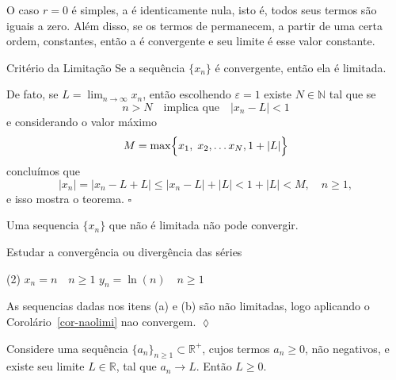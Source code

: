 O caso $r=0$ \'{e} simples, a \seq \'{e} identicamente nula, isto \'{e}, todos seus termos s\~{a}o iguais a zero. Al\'{e}m disso, se os termos de \seq permanecem, a partir de uma certa ordem, constantes, ent\~{a}o a \seq \'{e} convergente e seu limite \'{e} esse valor constante.

\begin{theoc}{Critério da Limitação}{}
  Se a sequência \(\{x_{n}\}\) é convergente, então ela é limitada. 
\end{theoc}

\begin{prvc}{}{}
De fato, se \(L=\lim_{n\to \infty}x_{n}\), então escolhendo \(\varepsilon=1\) existe \(N \in \mathbb{N}\) tal que se
\begin{equation*}
  n  > N \quad \text{implica que}\quad |x_{n}-L| < 1
\end{equation*}
e considerando  o valor máximo
\begin{equation*}
M=\max\Bigl\{x_{1}, \; x_{2}, \ldots x_{N}, 1+|L|\Bigr\}
\end{equation*} 
concluímos que
\begin{equation*}
|x_{n}| = |x_{n}-L+L| \leq |x_{n}-L |+|L| < 1+|L| < M, \quad n \geq 1,
\end{equation*}
e isso mostra o teorema. \hfill \(\square\)
\end{prvc}

\begin{mdframed}
\begin{coro}\label{cor-naolimi}
Uma sequencia \(\{x_{n}\}\) que não é limitada não pode convergir.
\end{coro}
\end{mdframed}

\begin{exer}
Estudar a convergência ou divergência das séries
\begin{tasks}[label=(\alph*), label-width=4ex,item-indent=3.0cm](2)
\task  \(x_{n}=n\quad n \geq 1\)
\task \(y_{n}=\ln(n) \quad n \geq 1 \)
\end{tasks}
\end{exer}

\solo As sequencias dadas nos itens (a) e (b) são não limitadas, logo aplicando o 
Corolário~\ref{cor-naolimi} nao convergem. \hfill \(\lozenge\)

\begin{fteo}\label{limt003}
Considere uma sequ\^{e}ncia $\{a_n\}_{n\geq 1}\subset \mathbb{R}^{+}$, cujos termos $a_n\geq 0$, n\~{a}o negativos, e existe seu limite $L\in \mathbb{R}$, tal que $a_n\to L$. Ent\~{a}o $L\geq 0$.
\end{fteo}

